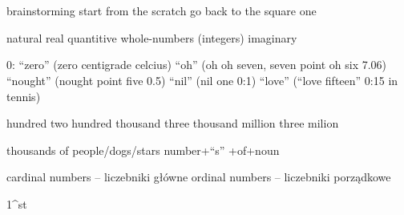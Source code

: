 \documentclass[a4paper,10pt]{article}
\title{}
\author{}
\begin{document}
\maketitle

\begin{abstract}

\end{abstract}

\section{}
brainstorming
start from the scratch
go back to the square one

natural
real
quantitive
whole-numbers (integers)
imaginary

0: “zero” (zero centigrade celcius)  “oh” (oh oh seven, seven point oh six 7.06) “nought” (nought point five 0.5) “nil” (nil one 0:1) “love” (“love fifteen” 0:15 in tennis)

hundred
two hundred
thousand
three thousand
million
three milion

thousands of people/dogs/stars
number+“s” +of+noun

cardinal numbers – liczebniki główne
ordinal numbers – liczebniki porządkowe

1^st
\end{document}
